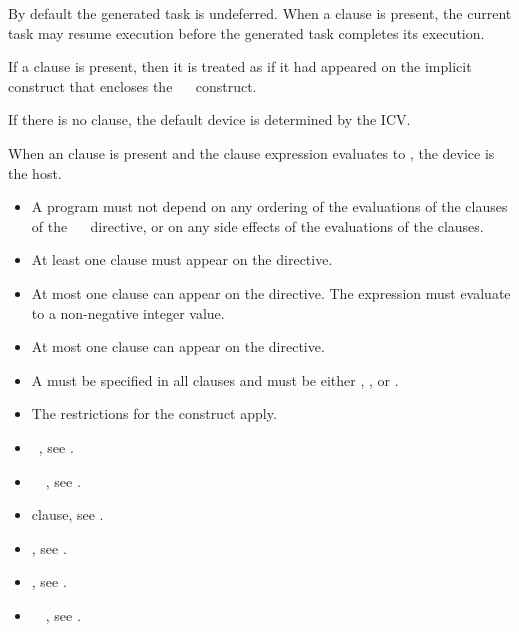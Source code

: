 By default the generated task is undeferred. When a  clause is present, the current task may resume execution before the generated task completes its execution.

If a  clause is present, then it is treated as if it had appeared on the implicit  construct that encloses the ~~ construct.

If there is no  clause, the default device is determined by the  ICV.

When an  clause is present and the  clause expression evaluates to , the device is the host. 
\restrictions
\begin{itemize}
\item A program must not depend on any ordering of the evaluations of the clauses of the ~~ directive, or on any side effects of the evaluations of the clauses.
\item At least one  clause must appear on the directive.
\item At most one  clause can appear on the directive. The  expression must evaluate to a non-negative integer value.
\item At most one  clause can appear on the directive.
\item A  must be specified in all  clauses and must be either , , or .
\item The restrictions for the  construct apply. 
\end{itemize}

\crossreferences
\begin{itemize}
\item {}~, see .
\item {}~~, see .
\item {} clause, see .
\item {}, see .
\item {}, see .
\item {}~~, see . 
\end{itemize}




